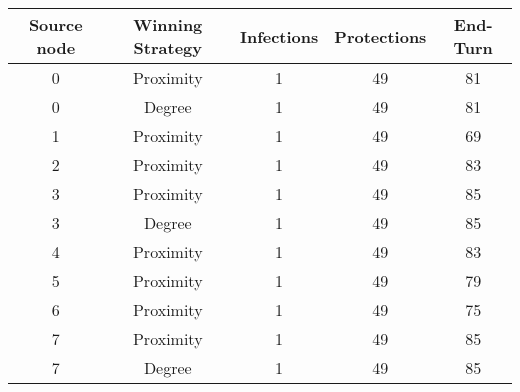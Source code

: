 \documentclass[results.tex]{subfiles}
\begin{document}
    \begin{center}
        \begin{tabular}{| c || c | c | c | c |}
            \hline
            {\bfseries Source node} & {\bfseries Winning Strategy} & {\bfseries Infections} & {\bfseries Protections}
            & {\bfseries End-Turn}
            \\  %
            \hline\hline
            0                       & Proximity                    & 1                      & 49                      & 81                   \\
            \hline
            0                       & Degree                       & 1                      & 49                      & 81                   \\
            \hline
            1                       & Proximity                    & 1                      & 49                      & 69                   \\
            \hline
            2                       & Proximity                    & 1                      & 49                      & 83                   \\
            \hline
            3                       & Proximity                    & 1                      & 49                      & 85                   \\
            \hline
            3                       & Degree                       & 1                      & 49                      & 85                   \\
            \hline
            4                       & Proximity                    & 1                      & 49                      & 83                   \\
            \hline
            5                       & Proximity                    & 1                      & 49                      & 79                   \\
            \hline
            6                       & Proximity                    & 1                      & 49                      & 75                   \\
            \hline
            7                       & Proximity                    & 1                      & 49                      & 85                   \\
            \hline
            7                       & Degree                       & 1                      & 49                      & 85                   \\

\end{tabular}
\end{center}
\end{document}
